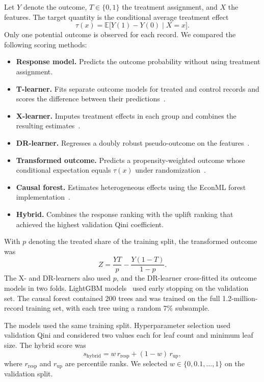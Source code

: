 \documentclass[conference]{IEEEtran}
\begin{document}
Let \(Y\) denote the outcome, \(T \in \{0,1\}\) the treatment assignment,
and \(X\) the features. The target quantity is the conditional average
treatment effect
\begin{equation}
  \tau(x) = \mathbb{E}\bigl[Y(1)-Y(0) \mid X=x\bigr].
\end{equation}
Only one potential outcome is observed for each record. We compared
the following scoring methods:

\begin{itemize}
  \item \textbf{Response model.} Predicts the outcome probability
        without using treatment assignment.
  \item \textbf{T-learner.} Fits separate outcome models for treated
        and control records and scores the difference between their
        predictions~\cite{kunzel2019}.
  \item \textbf{X-learner.} Imputes treatment effects in each group
        and combines the resulting estimates~\cite{kunzel2019}.
  \item \textbf{DR-learner.} Regresses a doubly robust pseudo-outcome
        on the features~\cite{kennedy2023}.
  \item \textbf{Transformed outcome.} Predicts a propensity-weighted
        outcome whose conditional expectation equals \(\tau(x)\)
        under randomization~\cite{jaskowski2012,athey2016}.
  \item \textbf{Causal forest.} Estimates heterogeneous effects using
        the EconML forest implementation~\cite{wager2018,athey2019,econml}.
  \item \textbf{Hybrid.} Combines the response ranking with the uplift
        ranking that achieved the highest validation Qini coefficient.
\end{itemize}

With \(p\) denoting the treated share of the training split, the transformed outcome was
\begin{equation}
  Z = \frac{YT}{p} - \frac{Y(1-T)}{1-p}.
\end{equation}
The X- and DR-learners also used \(p\), and the DR-learner cross-fitted
its outcome models in two folds. LightGBM models~\cite{lightgbm} used
early stopping on the validation set. The causal forest contained
200 trees and was trained on the full 1.2-million-record training set,
with each tree using a random 7\% subsample.

The models used the same training split. Hyperparameter selection used
validation Qini and considered two values each for leaf count and
minimum leaf size. The hybrid score was
\begin{equation}
  s_{\mathrm{hybrid}} =
  w\,r_{\mathrm{resp}} + (1-w)\,r_{\mathrm{up}},
\end{equation}
where \(r_{\mathrm{resp}}\) and \(r_{\mathrm{up}}\) are percentile ranks.
We selected \(w \in \{0,0.1,\ldots,1\}\) on the validation split.
\end{document}
